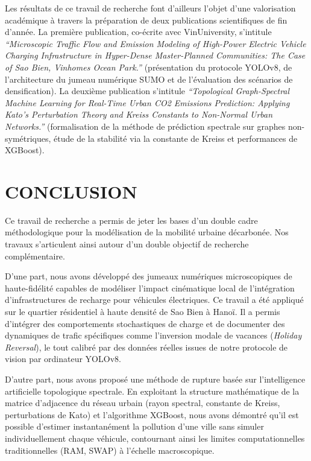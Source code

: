 \documentclass[10pt, a4paper]{article}
\begin{document}
Les résultats de ce travail de recherche font d'ailleurs l'objet d'une
valorisation académique à travers la préparation de deux publications
scientifiques de fin d'année. La première publication, co-écrite avec
VinUniversity, s'intitule \emph{``Microscopic Traffic Flow and Emission
Modeling of High-Power Electric Vehicle Charging Infrastructure in
Hyper-Dense Master-Planned Communities: The Case of Sao Bien, Vinhomes
Ocean Park.''} (présentation du protocole YOLOv8, de l'architecture du
jumeau numérique SUMO et de l'évaluation des scénarios de
densification). La deuxième publication s'intitule \emph{``Topological
Graph-Spectral Machine Learning for Real-Time Urban CO2 Emissions
Prediction: Applying Kato's Perturbation Theory and Kreiss Constants to
Non-Normal Urban Networks.''} (formalisation de la méthode de prédiction
spectrale sur graphes non-symétriques, étude de la stabilité via la
constante de Kreiss et performances de XGBoost).

\newpage

\section{CONCLUSION}\label{conclusion}

Ce travail de recherche a permis de jeter les bases d'un double cadre
méthodologique pour la modélisation de la mobilité urbaine décarbonée.
Nos travaux s'articulent ainsi autour d'un double objectif de recherche
complémentaire.

D'une part, nous avons développé des jumeaux numériques microscopiques
de haute-fidélité capables de modéliser l'impact cinématique local de
l'intégration d'infrastructures de recharge pour véhicules électriques.
Ce travail a été appliqué sur le quartier résidentiel à haute densité de
Sao Bien à Hanoï. Il a permis d'intégrer des comportements stochastiques
de charge et de documenter des dynamiques de trafic spécifiques comme
l'inversion modale de vacances (\emph{Holiday Reversal}), le tout
calibré par des données réelles issues de notre protocole de vision par
ordinateur YOLOv8.

D'autre part, nous avons proposé une méthode de rupture basée sur
l'intelligence artificielle topologique spectrale. En exploitant la
structure mathématique de la matrice d'adjacence du réseau urbain (rayon
spectral, constante de Kreiss, perturbations de Kato) et l'algorithme
XGBoost, nous avons démontré qu'il est possible d'estimer instantanément
la pollution d'une ville sans simuler individuellement chaque véhicule,
contournant ainsi les limites computationnelles traditionnelles (RAM,
SWAP) à l'échelle macroscopique.
\end{document}
